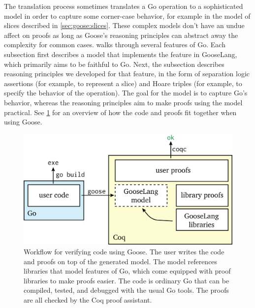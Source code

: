 The translation process sometimes translates a Go operation to a sophisticated
model in order to capture some corner-case behavior, for example in the model of
slices described in \cref{sec:goose:slices}. These complex models don't have an
undue affect on proofs as long as Goose's reasoning principles can abstract away
the complexity for common cases. 
walks through several features of Go. Each subsection first describes a model that
implements the feature in GooseLang, which primarily aims to
be faithful to Go. Next, the subsection describes reasoning principles we developed for that
feature, in the form of separation logic assertions (for example, to
represent a slice) and Hoare triples (for example, to specify the
behavior of the  operation). The goal for the model is to capture
Go's behavior, whereas the reasoning
principles aim to make proofs using the model practical. See
\cref{fig:goose:workflow} for an overview of how
the code and proofs fit together when using Goose.

\begin{figure}
  \includegraphics{fig/goose-proofs.png}
  \vspace{0.5\baselineskip}
  \caption[Workflow for verifying code with Goose]%
  {Workflow for verifying code using Goose. The user writes the code and
    proofs on top of the generated model. The model references libraries that
    model features of Go, which come equipped with proof libraries to make
    proofs easier. The code is ordinary Go that can be compiled, tested, and
    debugged with the usual Go tools. The proofs are all checked by the Coq
    proof assistant.}
  \label{fig:goose:workflow}
\end{figure}
